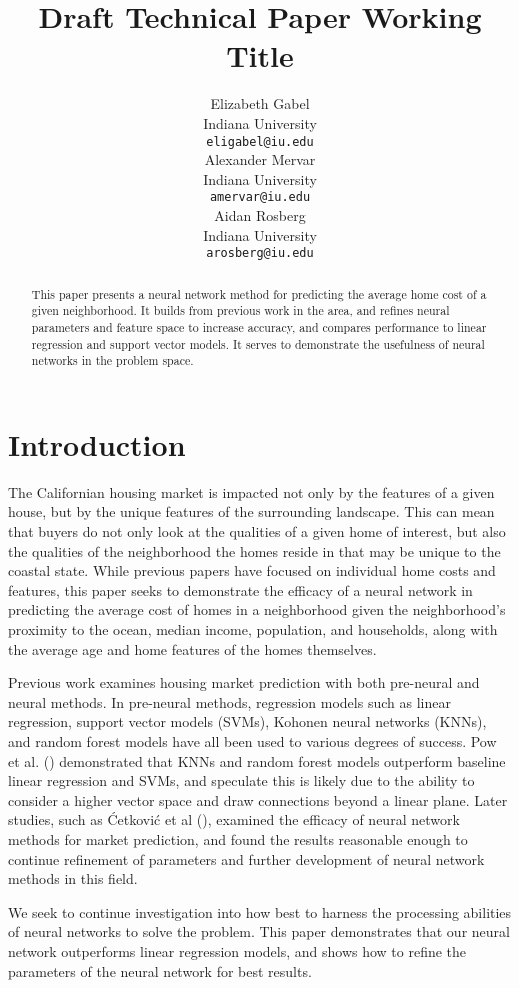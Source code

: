 \documentclass[11pt]{article}
\title{Draft Technical Paper Working Title}
\author{Elizabeth Gabel \\
 Indiana University \\
 \texttt{eligabel@iu.edu} \\\And
 Alexander Mervar \\
 Indiana University \\
 \texttt{amervar@iu.edu} \\\And
 Aidan Rosberg \\
 Indiana University \\
 \texttt{arosberg@iu.edu}\\}
\begin{document}
\maketitle
\begin{abstract}
This paper presents a neural network method for predicting the average home cost of a given neighborhood. It builds from previous work in the area, and refines neural parameters and feature space to increase accuracy, and compares performance to linear regression and support vector models. It serves to demonstrate the usefulness of neural networks in the problem space.
\end{abstract}

\section{Introduction}

The Californian housing market is impacted not only by the features of a given house, but by the unique features of the surrounding landscape. This can mean that buyers do not only look at the qualities of a given home of interest, but also the qualities of the neighborhood the homes reside in that may be unique to the coastal state. While previous papers have focused on individual home costs and features, this paper seeks to demonstrate the efficacy of a neural network in predicting the average cost of homes in a neighborhood given the neighborhood’s proximity to the ocean, median income, population, and households, along with the average age and home features of the homes themselves.

Previous work examines housing market prediction with both pre-neural and neural methods. In pre-neural methods, regression models such as linear regression, support vector models (SVMs), Kohonen neural networks (KNNs), and random forest models have all been used to various degrees of success. Pow et al. (\citeyear{Pow2014}) demonstrated that KNNs and random forest models outperform baseline linear regression and SVMs, and speculate this is likely due to the ability to consider a higher vector space and draw connections beyond a linear plane. Later studies, such as Ćetković et al (\citeyear{Cetkovic2018}), examined the efficacy of neural network methods for market prediction, and found the results reasonable enough to continue refinement of parameters and further development of neural network methods in this field.

We seek to continue investigation into how best to harness the processing abilities of neural networks to solve the problem. This paper demonstrates that our neural network outperforms linear regression models, and shows how to refine the parameters of the neural network for best results.
\end{document}
